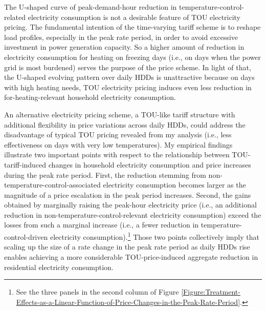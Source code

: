 The U-shaped curve of peak-demand-hour reduction in temperature-control-related electricity consumption is not a desirable feature of TOU electricity pricing. The fundamental intention of the time-varying tariff scheme is to reshape load profiles, especially in the peak rate period, in order to avoid excessive investment in power generation capacity. So a higher amount of reduction in electricity consumption for heating on freezing days (i.e., on days when the power grid is most burdened) serves the purpose of the price scheme. In light of that, the U-shaped evolving pattern over daily HDDs is unattractive because on days with high heating needs, TOU electricity pricing induces even less reduction in for-heating-relevant household electricity consumption. 

An alternative electricity pricing scheme, a TOU-like tariff structure with additional flexibility in price variations across daily HDDs, could address the disadvantage of typical TOU pricing revealed from my analysis (i.e., less effectiveness on days with very low temperatures). My empirical findings illustrate two important points with respect to the relationship between TOU-tariff-induced changes in household electricity consumption and price increases during the peak rate period. First, the reduction stemming from non-temperature-control-associated electricity consumption becomes larger as the magnitude of a price escalation in the peak period increases. Second, the gains obtained by marginally raising the peak-hour electricity price (i.e., an additional reduction in non-temperature-control-relevant electricity consumption) exceed the losses from such a marginal increase (i.e., a fewer reduction in temperature-control-driven electricity consumption).\footnote{See the three panels in the second column of Figure \ref{Figure:Treatment-Effects-as-a-Linear-Function-of-Price-Changes-in-the-Peak-Rate-Period}.} Those two points collectively imply that scaling up the size of a rate change in the peak rate period as daily HDDs rise enables achieving a more considerable TOU-price-induced aggregate reduction in residential electricity consumption. 

